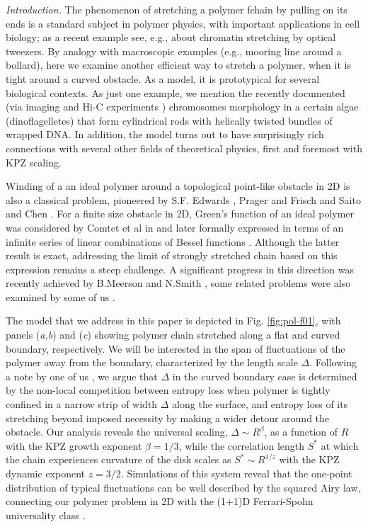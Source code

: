 \documentclass[aps,pre,floatfix,twocolumn,nofootinbib]{revtex4-2}
\begin{document}
\textit{Introduction.} The phenomenon of stretching a polymer fchain by pulling on its ends is a standard subject in polymer physics, with important applications in cell biology; as a recent example see, e.g., \cite{stretching} about chromatin stretching by optical tweezers.  By analogy with macroscopic examples (e.g., mooring line around a bollard), here we examine another efficient way to stretch a polymer, when it is tight around a curved obstacle.  As a model, it is prototypical for several biological contexts.  As just one example, we mention the recently documented (via imaging \cite{wong19,oakley70} and Hi-C experiments \cite{nand21}) chromosomes morphology in a certain algae (dinoflagelletes) that form cylindrical rods with helically twisted bundles of wrapped DNA. In addition, the model turns out to have surprisingly rich connections with several other fields of theoretical physics, first and foremost with KPZ scaling.

Winding of a an ideal polymer around a topological point-like obstacle in 2D is also a classical problem, pioneered by S.F. Edwards \cite{Edwards:1967}, Prager and Frisch \cite{Prager_Frisch} and Saito and Chen \cite{Chen}.  For a finite size obstacle in 2D, Green's function of an ideal polymer was considered by Comtet et al in \cite{Comtet} and later formally expressed in terms of an infinite series of linear combinations of Bessel functions \cite{Grosberg_Frish:2003}.  Although the latter result is exact, addressing the limit of strongly stretched chain based on this expression remains a steep challenge. A significant progress in this direction was recently achieved by B.Meerson and N.Smith \cite{Baruch1,Baruch2}, some related problems were also examined by some of us \cite{1,2,valov_fixman}.

The model that we address in this paper is depicted in Fig. \ref{fig:pol-f01}, with panels (\textit{a,b}) and (\textit{c}) showing polymer chain stretched along a flat and curved boundary, respectively.  We will be interested in the span of fluctuations of the polymer away from the boundary, characterized by the length scale $\Delta$.  Following a note by one of us \cite{Grosberg_Comment_2021}, we argue that $\Delta$ in the curved boundary case is determined by the non-local competition between entropy loss when polymer is tightly confined in a narrow strip of width $\Delta$ along the surface, and entropy loss of its stretching beyond imposed necessity by making a wider detour around the obstacle. Our analysis reveals the universal scaling, $\Delta \sim R^{\beta}$, as a function of $R$ with the KPZ growth exponent $\beta=1/3$, while the correlation length $S^*$ at which the chain experiences curvature of the disk scales as $S^* \sim R^{1/z}$ with the KPZ dynamic exponent $z=3/2$. Simulations of this system reveal that the one-point distribution of typical fluctuations can be well described by the squared Airy law, connecting our polymer problem in 2D with the (1+1)D Ferrari-Spohn universality class \cite{spohn_ferrari,Baruch1}.
\end{document}
